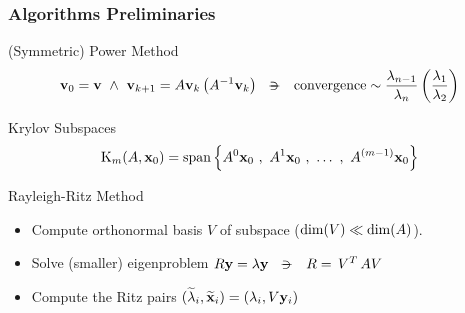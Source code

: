 \begin{frame}
  \frametitle{Algorithms Preliminaries}
  \begin{block}{(Symmetric) Power Method}
    \[
    \joinabove{0}
    \vec{v}_0 = \vec{v} \ds{\land}
    \vec{v}_{k+1} = A\vec{v}_k \left( \inv{A}\vec{v}_k \right)
    \ds{\suchthat}
    \func{convergence} \sim \dfrac{\lambda_{n-1}}{\lambda_n}
    \left( \dfrac{\lambda_1}{\lambda_2} \right)
    \joinbelow{0}
    \]
  \end{block}
  \begin{block}{Krylov Subspaces}
    \[
    \joinabove{0}
    \Krylov{A}{\vec{x}_0}{m} =
    \func{span}
    \left\{
      A^0\vec{x}_0\ds{,} A^1\vec{x}_0\ds{,} \ldots \ds{,}  A^{(m-1)}\vec{x}_0
      \right\}
    \joinbelow{0}      
    \]
  \end{block}
  \begin{block}{Rayleigh-Ritz Method}
    \begin{itemize}
    \item Compute orthonormal basis $V$ of subspace
      ($\operatorname{dim}(V) \ll \operatorname{dim}(A)$).
    \item Solve (smaller) eigenproblem $R\vec{y} = \lambda\vec{y}
      \ds{\suchthat} R = \trans{V} A V$
    \item Compute the Ritz pairs
      $(\widetilde{\lambda}_i,\widetilde{\mathbf{x}}_i) = (\lambda_i, V\mathbf{y}_i)$
    \end{itemize}
  \end{block}
\end{frame}
